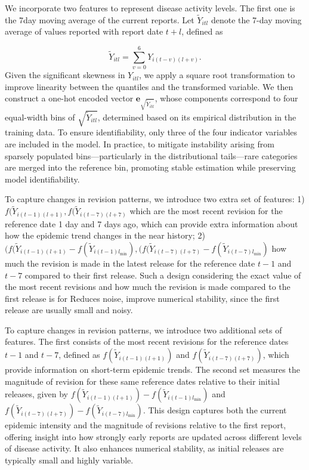 We incorporate two features to represent disease activity levels.  The first one is the 7day moving average of the current reports. Let \( \widetilde{Y}_{itl} \) denote the 7-day moving average of values reported with report date \( t + l \), defined as

\[
\widetilde{Y}_{itl} = \sum_{v=0}^{6} Y_{i(t - v)(l + v)}.
\] 
Given the significant skewness in \( Y_{itl} \), we apply a square root transformation to improve linearity between the quantiles and the transformed variable. We then construct a one-hot encoded vector \( \mathbf{e}_{\sqrt{\widetilde{Y}_{itl}}} \), whose components correspond to four equal-width bins of \( \sqrt{\widetilde{Y}_{itl}} \), determined based on its empirical distribution in the training data. To ensure identifiability, only three of the four indicator variables are included in the model. In practice, to mitigate instability arising from sparsely populated bins—particularly in the distributional tails—rare categories are merged into the reference bin, promoting stable estimation while preserving model identifiability.

To capture changes in revision patterns, we introduce two extra set of features: 
1) $f(\widetilde{Y}_{i(t-1)(l+1)}, f(\widetilde{Y}_{i(t-7)(l+7)} $ which are the most recent revision for the reference date 1 day and 7 days ago, which can provide extra information about how the epidemic trend changes in the near history; 2)  $(f(\widetilde{Y}_{i(t-1)(l+1)} - f(\widetilde{Y}_{i(t-1)l_{\text{min}}}), (f(\widetilde{Y}_{i(t-7)(l+7)} - f(\widetilde{Y}_{i(t-7)l_{\text{min}}})$ how much the revision is made in the latest release for the reference date $t-1$ and $t-7$ compared to their first release.  Such a design considering the exact value of the most recent revisions and how much the revision is made compared to the first release is for Reduces noise, improve numerical stability, since the first release are usually small and noisy.

To capture changes in revision patterns, we introduce two additional sets of features. The first consists of the most recent revisions for the reference dates \( t - 1 \) and \( t - 7 \), defined as \( f(\widetilde{Y}_{i(t-1)(l+1)}) \) and \( f(\widetilde{Y}_{i(t-7)(l+7)}) \), which provide information on short-term epidemic trends. The second set measures the magnitude of revision for these same reference dates relative to their initial releases, given by \( f(\widetilde{Y}_{i(t-1)(l+1)}) - f(\widetilde{Y}_{i(t-1)l_{\text{min}}}) \) and \( f(\widetilde{Y}_{i(t-7)(l+7)}) - f(\widetilde{Y}_{i(t-7)l_{\text{min}}}) \). This design captures both the current epidemic intensity and the magnitude of revisions relative to the first report, offering insight into how strongly early reports are updated across different levels of disease activity. It also enhances numerical stability, as initial releases are typically small and highly variable.

